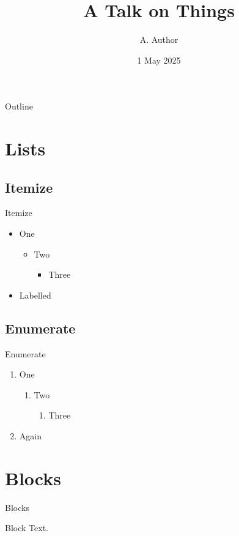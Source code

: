 \documentclass{beamer}
\title[Short]{A Talk on Things}
\author{A. Author}
\institute{Institute}
\date{1 May 2025}
\begin{document}
\begin{frame}
\titlepage
\end{frame}
\begin{frame}{Outline}
\tableofcontents
\end{frame}
\section{Lists}
\subsection{Itemize}
\begin{frame}{Itemize}
\begin{itemize}
\item One
\begin{itemize}
\item Two
\begin{itemize}
\item Three
\end{itemize}
\end{itemize}
\item[x] Labelled
\end{itemize}
\end{frame}
\subsection{Enumerate}
\begin{frame}{Enumerate}
\begin{enumerate}
\item One
\begin{enumerate}
\item Two
\begin{enumerate}
\item Three
\end{enumerate}
\end{enumerate}
\item Again
\end{enumerate}
\end{frame}
\section{Blocks}
\begin{frame}{Blocks}
\begin{block}{Block}
Text.
\end{block}
\end{frame}
\end{document}

